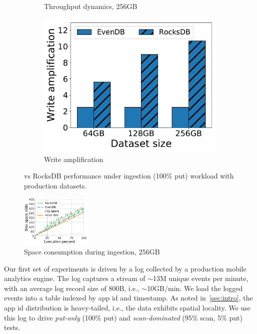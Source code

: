 \begin{figure}[tb]
\begin{subfigure}{0.3\linewidth}
\caption{Throughput dynamics, 256GB}
\label{fig:prod:ingestion:b}
\end{subfigure}
\begin{subfigure}{0.3\linewidth}
\includegraphics[width=\textwidth]{figs/write_amp_256.pdf}
\caption{Write amplification}
\label{fig:prod:ingestion:c}
\end{subfigure}
\caption{\sys\/ vs RocksDB performance under ingestion (100\% put) workload with production datasets.}
\label{fig:prod:ingestion}
\end{figure}

\begin{figure}[tb]
	\includegraphics[width=0.3\textwidth]{figs/space_timeline_real_line.pdf}
	\caption{{Space consumption during ingestion, 256GB}}
	\label{fig:space_timeline}
\end{figure}



Our first set of experiments is driven by a log collected by a production mobile analytics engine. The log captures 
a stream  of $\sim$13M unique events per minute, with an average log record size of 800B, i.e., $\sim$10GB/min. 
We load the logged events into a table indexed by app id and timestamp. 
As noted in~\cref{sec:intro}, the app id distribution is heavy-tailed, i.e., the data exhibits spatial locality. 
We use this log to drive \emph{put-only} (100\% put) and \emph{scan-dominated} 
(95\% scan, 5\% put) tests.

